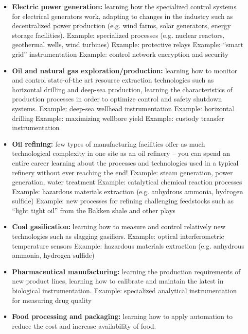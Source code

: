 \begin{itemize}
\item{} {\bf Electric power generation:} learning how the specialized control systems for electrical generators work, adapting to changes in the industry such as decentralized power production (e.g. wind farms, solar generators, energy storage facilities).
\itemitem{} Example: specialized processes (e.g. nuclear reactors, geothermal wells, wind turbines)
\itemitem{} Example: protective relays
\itemitem{} Example: ``smart grid'' instrumentation
\itemitem{} Example: control network encryption and security
\item{} {\bf Oil and natural gas exploration/production:} learning how to monitor and control state-of-the art resource extraction technologies such as horizontal drilling and deep-sea production, learning the characteristics of production processes in order to optimize control and safety shutdown systems.
\itemitem{} Example: deep-sea wellhead instrumentation
\itemitem{} Example: horizontal drilling
\itemitem{} Example: maximizing wellbore yield
\itemitem{} Example: custody transfer instrumentation
\item{} {\bf Oil refining:} few types of manufacturing facilities offer as much technological complexity in one site as an oil refinery -- you can spend an entire career learning about the processes and technologies used in a typical refinery without ever reaching the end!
\itemitem{} Example: steam generation, power generation, water treatment
\itemitem{} Example: catalytical chemical reaction processes
\itemitem{} Example: hazardous materials extraction (e.g. anhydrous ammonia, hydrogen sulfide)
\itemitem{} Example: new processes for refining challenging feedstocks such as ``light tight oil'' from the Bakken shale and other plays
\item{} {\bf Coal gasification:} learning how to measure and control relatively new technologies such as slagging gasifiers.
\itemitem{} Example: optical interferometric temperature sensors
\itemitem{} Example: hazardous materials extraction (e.g. anhydrous ammonia, hydrogen sulfide)
\item{} {\bf Pharmaceutical manufacturing:} learning the production requirements of new product lines, learning how to calibrate and maintain the latest in biological instrumentation.  
\itemitem{} Example: specialized analytical instrumentation for measuring drug quality
\item{} {\bf Food processing and packaging:} learning how to apply automation to reduce the cost and increase availability of food.

\end{itemize}
